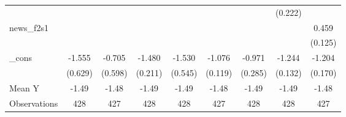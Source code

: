{\begin{tabular}{l*{8}{c}}
            &                     &                     &                     &                     &                     &                     &     (0.222)         &                     \\
\addlinespace
news\_f2s1   &                     &                     &                     &                     &                     &                     &                     &       0.459\sym{***}\\
            &                     &                     &                     &                     &                     &                     &                     &     (0.125)         \\
\addlinespace
\_cons      &      -1.555\sym{**} &      -0.705         &      -1.480\sym{***}&      -1.530\sym{**} &      -1.076\sym{***}&      -0.971\sym{***}&      -1.244\sym{***}&      -1.204\sym{***}\\
            &     (0.629)         &     (0.598)         &     (0.211)         &     (0.545)         &     (0.119)         &     (0.285)         &     (0.132)         &     (0.170)         \\
\midrule
Mean Y      &       -1.49         &       -1.48         &       -1.49         &       -1.49         &       -1.48         &       -1.49         &       -1.49         &       -1.48         \\
Observations&         428         &         427         &         428         &         428         &         427         &         428         &         428         &         427         \\
\bottomrule
\end{tabular}
}
